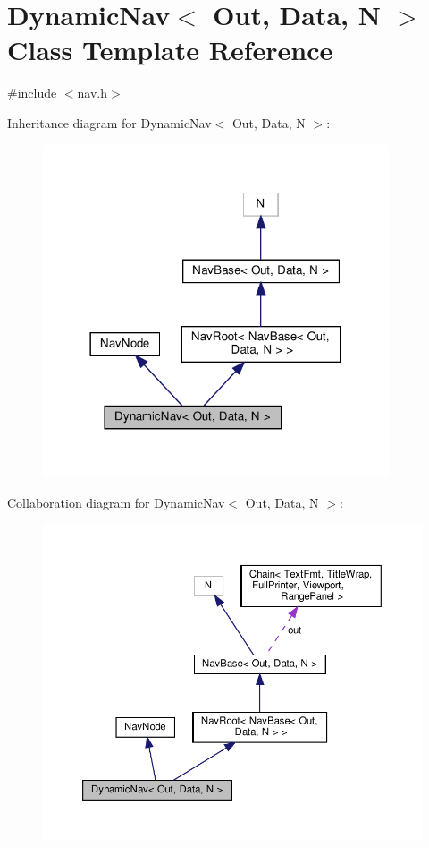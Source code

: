 \hypertarget{classDynamicNav}{}\section{Dynamic\+Nav$<$ Out, Data, N $>$ Class Template Reference}
\label{classDynamicNav}


{\ttfamily \#include $<$nav.\+h$>$}



Inheritance diagram for Dynamic\+Nav$<$ Out, Data, N $>$\+:\nopagebreak
\begin{figure}[H]
\begin{center}
\leavevmode
\includegraphics[width=290pt]{classDynamicNav__inherit__graph}
\end{center}
\end{figure}


Collaboration diagram for Dynamic\+Nav$<$ Out, Data, N $>$\+:\nopagebreak
\begin{figure}[H]
\begin{center}
\leavevmode
\includegraphics[width=350pt]{classDynamicNav__coll__graph}
\end{center}
\end{figure}
